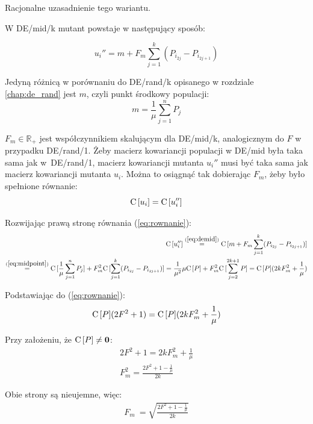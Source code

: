 \documentclass[a4paper,onecolumn,oneside,11pt,wide,floatssmall]{mwrep}
\def\C{{\rm C}\,}
\theoremstyle{definition}
\theoremstyle{plain}%
\theoremstyle{remark}
\begin{document}
Racjonalne uzasadnienie tego wariantu.

W DE/mid/k mutant powstaje w następujący sposób:

\begin{equation} \label{eq:demid}
u_i'' = m + F_m\sum\limits_{j=1}^k (P_{i_{2j}} - P_{i_{2j+1}})
\end{equation}

Jedyną różnicą w porównaniu do DE/rand/k opisanego w rozdziale \ref{chap:de_rand} jest $m$, czyli punkt środkowy populacji:
\begin{equation} \label{eq:midpoint}
m = \frac{1}{\mu}\sum\limits_{j=1}^n P_j
\end{equation}

$F_m\in\mathbb{R_+}$ jest współczynnikiem skalującym dla DE/mid/k, analogicznym do $F$ 
w przypadku DE/rand/1. 
Żeby macierz kowariancji populacji w DE/mid była taka sama jak w~DE/rand/1, 
macierz kowariancji mutanta $u_i''$ musi być taka sama jak macierz kowariancji mutanta $u_i$.
Można to osiągnąć tak dobierając $F_m$, żeby było spełnione równanie:
\begin{equation} \label{eq:rownanie}
\C[u_i] = \C[u_i'']
\end{equation}

Rozwijając prawą stronę równania (\ref{eq:rownanie}):
\begin{align*}
\C[u_i''] \overset{(\ref{eq:demid})}{=} \C[m + F_m\sum\limits_{j=1}^k (P_{i_{2j}} - P_{i_{2j+1}})] \\
\overset{(\ref{eq:midpoint})}{=} \C[\frac{1}{\mu}\sum\limits_{j=1}^n P_j] + F_m^2\C[\sum\limits_{j=1}^k (P_{i_{2j}} - P_{i_{2j+1}})] 
= \frac{1}{\mu^2}\mu\C[P] + F_m^2\C[\sum\limits_{j=2}^{2k+1} P] = \C[P](2kF_m^2 + \frac{1}{\mu})
\end{align*}

Podstawiając do (\ref{eq:rownanie}):
\begin{align*}
\C[P](2F^2 + 1) = \C[P](2kF_m^2 + \frac{1}{\mu})
\end{align*}

Przy założeniu, że $\C[P] \neq \textbf{0}$:
\begin{align*}
2F^2 + 1 = 2kF_m^2 + \frac{1}{\mu} \\
F_m^2 = \frac{2F^2 + 1 - \frac{1}{\mu}}{2k}
\end{align*}

Obie strony są nieujemne, więc:
\begin{align} \label{eq:a}
F_m\ = \sqrt{\frac{2F^2 + 1 - \frac{1}{\mu}}{2k}}
\end{align}
\end{document}
